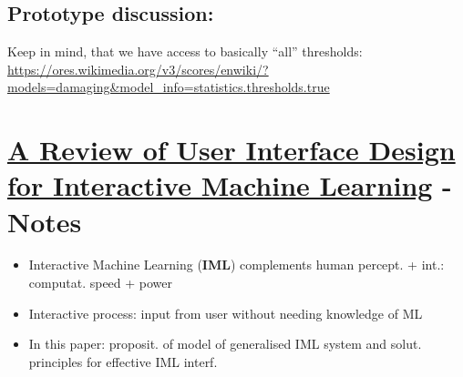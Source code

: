 \documentclass[12pt,a4paper]{article}
\begin{document}
\subsection{Prototype discussion:}
Keep in mind, that we have access to basically ``all'' thresholds: \url{https://ores.wikimedia.org/v3/scores/enwiki/?models=damaging&model_info=statistics.thresholds.true}
%
%
%
%
%
\section{\href{https://doi.org/10.1145/3185517}{A Review of User Interface Design for Interactive Machine Learning} - Notes}
\begin{itemize}
\item Interactive Machine Learning (\textbf{IML}) complements human percept. + int.: computat. speed + power
\item Interactive process: input from user without needing knowledge of ML
\item In this paper: proposit. of model of generalised IML system and solut. principles for effective IML interf.
\end{itemize}
\end{document}
